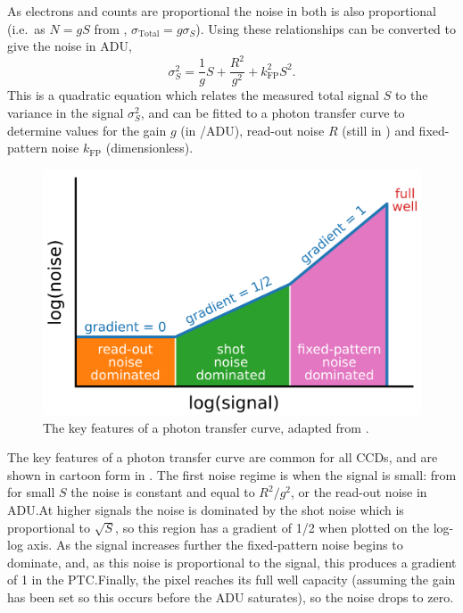 \begin{colsection}
As electrons and counts are proportional the noise in both is also proportional (i.e.\ as $N=gS$ from ,  $\sigma_\text{Total} = g\sigma_S$). Using these relationships  can be converted to give the noise in ADU,
%
\begin{equation}
    \sigma_S^2 = \frac{1}{g} S + \frac{R^2}{g^2} + k_\text{FP}^2 S^2.
    \label{eq:ptc}
\end{equation}
%
This is a quadratic equation which relates the measured total signal $S$ to the variance in the signal $\sigma_S^2$, and can be fitted to a photon transfer curve to determine values for the gain $g$ (in \elec/ADU), read-out noise $R$ (still in \elec{}) and fixed-pattern noise $k_\text{FP}$ (dimensionless).

\begin{figure}[t]
    \begin{center}
        \includegraphics[width=0.8\linewidth]{images/ptc.pdf}
    \end{center}
    \caption[Key features of the photon transfer curve]{
        The key features of a photon transfer curve, adapted from \citet{CCDs}.
    }\label{fig:ptc_cartoon}
\end{figure}

The key features of a photon transfer curve are common for all CCDs, and are shown in cartoon form in . The first noise regime is when the signal is small: from  for small $S$ the noise is constant and equal to $R^2/g^2$, or the read-out noise in ADU.\@ At higher signals the noise is dominated by the shot noise which is proportional to $\sqrt{S}$, so this region has a gradient of 1/2 when plotted on the log-log axis. As the signal increases further the fixed-pattern noise begins to dominate, and, as this noise is proportional to the signal, this produces a gradient of 1 in the PTC.\@ Finally, the pixel reaches its full well capacity (assuming the gain has been set so this occurs before the ADU saturates), so the noise drops to zero.


\end{colsection}
